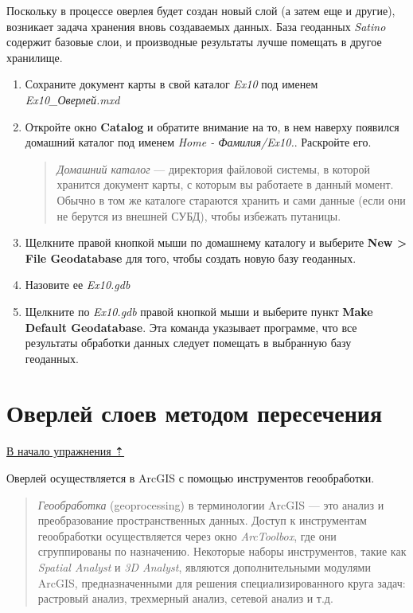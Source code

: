 \documentclass[]{book}
\theoremstyle{definition}
\theoremstyle{definition}
\theoremstyle{definition}
\theoremstyle{remark}
\begin{document}
Поскольку в процессе оверлея будет создан новый слой (а затем еще и
другие), возникает задача хранения вновь создаваемых данных. База
геоданных \emph{Satino} содержит базовые слои, и производные результаты
лучше помещать в другое хранилище.

\begin{enumerate}
\def\labelenumi{\arabic{enumi}.}
\item
  Сохраните документ карты в свой каталог \emph{Ex10} под именем
  \emph{Ex10\_Оверлей.mxd}
\item
  Откройте окно \textbf{Catalog} и обратите внимание на то, в нем
  наверху появился домашний каталог под именем \emph{Home -
  Фамилия/Ex10.}. Раскройте его.

  \begin{quote}
  \emph{Домашний каталог} --- директория файловой системы, в которой
  хранится документ карты, с которым вы работаете в данный момент.
  Обычно в том же каталоге стараются хранить и сами данные (если они не
  берутся из внешней СУБД), чтобы избежать путаницы.
  \end{quote}
\item
  Щелкните правой кнопкой мыши по домашнему каталогу и выберите
  \textbf{New \textgreater{} File Geodatabase} для того, чтобы создать
  новую базу геоданных.
\item
  Назовите ее \emph{Ex10.gdb}
\item
  Щелкните по \emph{Ex10.gdb} правой кнопкой мыши и выберите пункт
  \textbf{Make Default Geodatabase}. Эта команда указывает программе,
  что все результаты обработки данных следует помещать в выбранную базу
  геоданных.
\end{enumerate}

\hypertarget{overlay-intersect}{%
\section{Оверлей слоев методом пересечения}\label{overlay-intersect}}

\protect\hyperlink{overlay}{В начало упражнения ⇡}

Оверлей осуществляется в ArcGIS с помощью инструментов геообработки.

\begin{quote}
\emph{Геообработка} (geoprocessing) в терминологии ArcGIS --- это анализ
и преобразование пространственных данных. Доступ к инструментам
геообработки осуществляется через окно \emph{ArcToolbox}, где они
сгруппированы по назначению. Некоторые наборы инструментов, такие как
\emph{Spatial Analyst} и \emph{3D Analyst}, являются дополнительными
модулями ArcGIS, предназначенными для решения специализированного круга
задач: растровый анализ, трехмерный анализ, сетевой анализ и т.д.
\end{quote}
\end{document}
